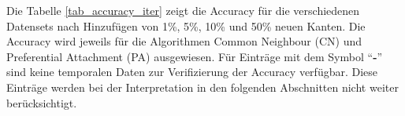 Die Tabelle \ref{tab_accuracy_iter} zeigt die Accuracy für die verschiedenen Datensets nach Hinzufügen von 1\%, 5\%, 10\% und 50\% neuen Kanten.
Die Accuracy wird jeweils für die Algorithmen Common Neighbour (CN) und Preferential Attachment (PA) ausgewiesen.
Für Einträge mit dem Symbol ``\textbf{-}'' sind keine temporalen Daten zur Verifizierung der Accuracy verfügbar.
Diese Einträge werden bei der Interpretation in den folgenden Abschnitten nicht weiter berücksichtigt.
\begin{table}[]
    \centering
    \label{tab_accuracy_iter}
    \caption{Erreichte Accuracy in \%}
\end{table}

